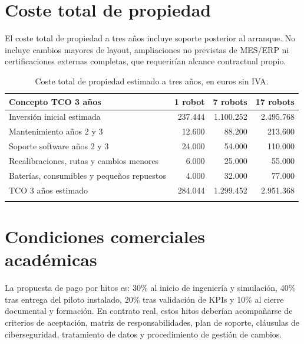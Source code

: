 \section{Coste total de propiedad}

El coste total de propiedad a tres años incluye soporte posterior al arranque. No incluye cambios mayores de layout, ampliaciones no previstas de MES/ERP ni certificaciones externas completas, que requerirían alcance contractual propio.

\begin{longtable}{P{0.36\textwidth}r r r}
\toprule
Concepto TCO 3 años & 1 robot & 7 robots & 17 robots\\
\midrule
\endhead
Inversión inicial estimada & 237.444 & 1.100.252 & 2.495.768\\
Mantenimiento años 2 y 3 & 12.600 & 88.200 & 213.600\\
Soporte software años 2 y 3 & 24.000 & 54.000 & 110.000\\
Recalibraciones, rutas y cambios menores & 6.000 & 25.000 & 55.000\\
Baterías, consumibles y pequeños repuestos & 4.000 & 32.000 & 77.000\\
\midrule
TCO 3 años estimado & 284.044 & 1.299.452 & 2.951.368\\
\bottomrule
\caption{Coste total de propiedad estimado a tres años, en euros sin IVA.}
\label{tab:tco}
\end{longtable}

\section{Condiciones comerciales académicas}

La propuesta de pago por hitos es: 30\% al inicio de ingeniería y simulación, 40\% tras entrega del piloto instalado, 20\% tras validación de KPIs y 10\% al cierre documental y formación. En contrato real, estos hitos deberían acompañarse de criterios de aceptación, matriz de responsabilidades, plan de soporte, cláusulas de ciberseguridad, tratamiento de datos y procedimiento de gestión de cambios.
